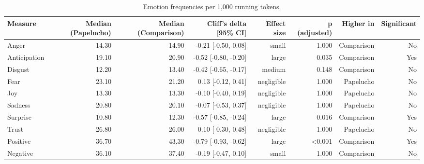 \begin{table}[htbp]
\centering
\small
\caption{Emotion frequencies per 1,000 running tokens.}
\label{tab:emotions-normalised}
\begin{tabular}{lrrrrrrr}
\toprule
\textbf{Measure} & \textbf{Median (Papelucho)} & \textbf{Median (Comparison)} & \textbf{Cliff's delta [95\% CI]} & \textbf{Effect size} & \textbf{p (adjusted)} & \textbf{Higher in} & \textbf{Significant} \\
\midrule
Anger & 14.30 & 14.90 & -0.21 [-0.50, 0.08] & small & 1.000 & Comparison & No \\
Anticipation & 19.10 & 20.90 & -0.52 [-0.80, -0.20] & large & 0.035 & Comparison & Yes \\
Disgust & 12.20 & 13.40 & -0.42 [-0.65, -0.17] & medium & 0.148 & Comparison & No \\
Fear & 23.10 & 21.20 & 0.13 [-0.12, 0.41] & negligible & 1.000 & Papelucho & No \\
Joy & 13.30 & 13.30 & -0.10 [-0.40, 0.19] & negligible & 1.000 & Papelucho & No \\
Sadness & 20.80 & 20.10 & -0.07 [-0.53, 0.37] & negligible & 1.000 & Papelucho & No \\
Surprise & 10.80 & 12.30 & -0.57 [-0.85, -0.24] & large & 0.016 & Comparison & Yes \\
Trust & 26.80 & 26.00 & 0.10 [-0.30, 0.48] & negligible & 1.000 & Papelucho & No \\
Positive & 36.70 & 43.30 & -0.79 [-0.93, -0.62] & large & <0.001 & Comparison & Yes \\
Negative & 36.10 & 37.40 & -0.19 [-0.47, 0.10] & small & 1.000 & Comparison & No \\
\bottomrule
\end{tabular}
\end{table}

